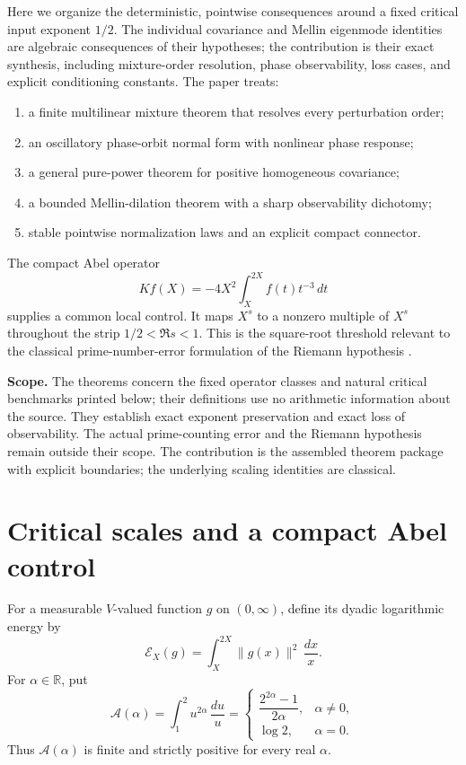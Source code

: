 \documentclass[11pt,a4paper]{amsart}
\theoremstyle{definition}
\newcommand{\R}{\mathbb R}
\newcommand{\norm}[1]{\lVert #1\rVert}
\newcommand{\cE}{\mathcal E}
\newcommand{\cA}{\mathcal A}
\begin{document}
Here we organize the deterministic, pointwise consequences around a fixed critical input exponent $1/2$.  The individual covariance and Mellin eigenmode identities are algebraic consequences of their hypotheses; the contribution is their exact synthesis, including mixture-order resolution, phase observability, loss cases, and explicit conditioning constants.  The paper treats:
\begin{enumerate}[label=\textup{(\Roman*)},leftmargin=2.6em]
  \item a finite multilinear mixture theorem that resolves every perturbation order;
  \item an oscillatory phase-orbit normal form with nonlinear phase response;
  \item a general pure-power theorem for positive homogeneous covariance;
  \item a bounded Mellin-dilation theorem with a sharp observability dichotomy;
  \item stable pointwise normalization laws and an explicit compact connector.
\end{enumerate}
The compact Abel operator
\begin{equation}\label{eq:K-intro}
  Kf(X)=-4X^2\int_X^{2X}f(t)t^{-3}\,dt
\end{equation}
supplies a common local control.  It maps $X^s$ to a nonzero multiple of $X^s$ throughout the strip $1/2<\Re s<1$.  This is the square-root threshold relevant to the classical prime-number-error formulation of the Riemann hypothesis \cite{vonKoch1901}.

\medskip
\noindent\textbf{Scope.}
The theorems concern the fixed operator classes and natural critical
benchmarks printed below; their definitions use no arithmetic information
about the source.  They establish exact exponent preservation and exact loss
of observability.  The actual prime-counting error and the Riemann hypothesis
remain outside their scope.  The contribution is the assembled theorem
package with explicit boundaries; the underlying scaling identities are
classical.

\section{Critical scales and a compact Abel control}\label{sec:critical}

For a measurable $V$-valued function $g$ on $(0,\infty)$, define its dyadic logarithmic energy by
\begin{equation}\label{eq:energy}
  \cE_X(g)=\int_X^{2X}\norm{g(x)}^2\,\frac{dx}{x}.
\end{equation}
For $\alpha\in\R$, put
\begin{equation}\label{eq:A-alpha}
 \cA(\alpha)=\int_1^2u^{2\alpha}\,\frac{du}{u}
 =\begin{cases}
 \dfrac{2^{2\alpha}-1}{2\alpha},&\alpha\ne0,\\[6pt]
 \log2,&\alpha=0.
 \end{cases}
\end{equation}
Thus $\cA(\alpha)$ is finite and strictly positive for every real $\alpha$.
\end{document}
